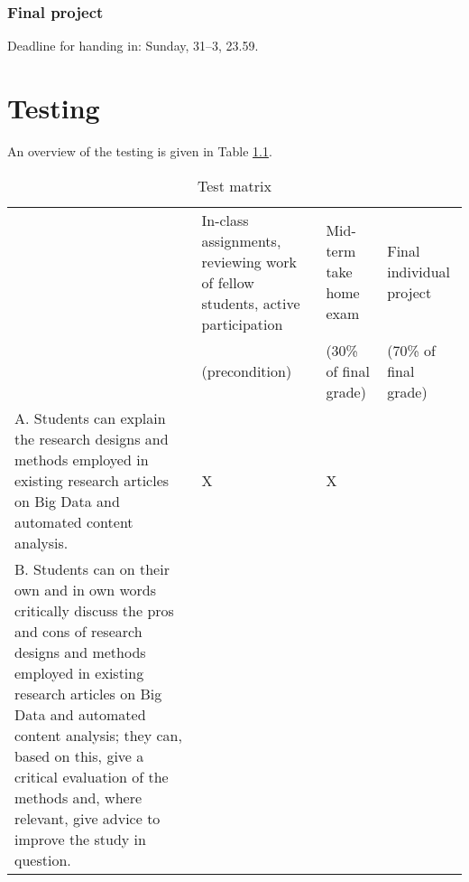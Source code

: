 \documentclass[a4paper,12pt]{report}
\begin{document}
\subsection*{Final project}
Deadline for handing in: Sunday, 31--3, 23.59.




\chapter{Testing}
An overview of the testing is given in Table \ref{testmatrix}.

\begin{table}[]
\footnotesize{
\centering
\caption{Test matrix}
\label{testmatrix}
\begin{tabular}{p{8cm}p{2cm}p{2cm}p{2cm}}
                                                                                                                                                                                                                                                                                                                                                                                            & In-class assignments, reviewing work of fellow students, active participation  
& Mid-term take home exam 
& Final individual project \\
                                                                                                                                                                                                                                                                                                                                                                                                                   &  (precondition)                                                                                            & (30\% of final grade)   & (70\% of final grade)    \\
A. Students can explain the research designs and methods employed in existing research articles on Big Data and automated content analysis.                                                                                                                                                                                                                      & X                                                                                            & X                       &                          \\
B. Students can on their own and in own words critically discuss the pros and cons of research designs and methods employed in existing research articles on Big Data and automated content analysis; they can, based on this, give a critical evaluation of the methods and, where relevant, give advice to improve the study in question.

\end{tabular}}
\end{table}
\end{document}
